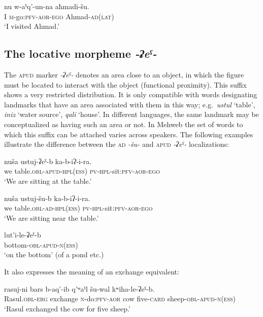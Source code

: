 ﻿\documentclass[output=paper]{langsci/langscibook}
\begin{document}
\ea
\gll nu w-aˤq'-un-na aħmadi-šu.\\
I \textsc{m}-go:\textsc{pfv}-\textsc{aor}-\textsc{ego} Ahmad-\textsc{ad}(\textsc{lat})\\
\glt `I visited Ahmad.'
\z

\subsection{The locative morpheme \emph{-ʡeˤ-}}
\label{the-locative-morpheme--ux2a1eux2c1-}

The \textsc{apud} marker \emph{-ʡeˤ-} denotes an area close to an
object, in which the figure must be located to interact with the object
(functional proximity). This suffix shows a very restricted
distribution. It is only compatible with words designating landmarks
that have an area associated with them in this way; e.g.\ \emph{ustul}
`table', \emph{iniz} `water source', \emph{qali} `house'. In different
languages, the same landmark may be conceptualized as having such an
area or not. In Mehweb the set of words to which this suffix can be attached
varies across speakers. The following examples illustrate the difference
between the \textsc{ad} \emph{-šu-} and \textsc{apud} \emph{-ʡeˤ-}
localizations:

\ea
\gll nuša ustuj-ʡeˤ-b ka-b-iʔ-i-ra.\\
we table.\textsc{obl}-\textsc{apud}-\textsc{hpl}(\textsc{ess}) \textsc{pv}-\textsc{hpl}-sit:\textsc{pfv}-\textsc{aor}-\textsc{ego}\\
\glt `We are sitting at the table.'

\ex
\gll nuša ustuj-šu-b ka-b-iʔ-i-ra.\\
we table.\textsc{obl}-\textsc{ad}-\textsc{hpl}(\textsc{ess}) \textsc{pv}-\textsc{hpl}-sit:\textsc{pfv}-\textsc{aor}-\textsc{ego}\\
\glt `We are sitting near the table.'

\ex
\gll lut'i-le-ʡeˤ-b\\
bottom-\textsc{obl}-\textsc{apud}-\textsc{n}(\textsc{ess})\\
\glt `on the bottom' (of a pond etc.)
\z

It also expresses the meaning of an exchange equivalent:

\nopagebreak

\ea
\gll rasuj-ni bars b-aq'-ib q'ʷaˤl šu-wal {kʷiha-le-ʡeˤ-b}.\\
Rasul.\textsc{obl}-\textsc{erg} exchange \textsc{n}-do:\textsc{pfv}-\textsc{aor} cow five-\textsc{card} sheep-\textsc{obl}-\textsc{apud}-\textsc{n}(\textsc{ess})\\
\glt `Rasul exchanged the cow for five sheep.'
\z
\end{document}
